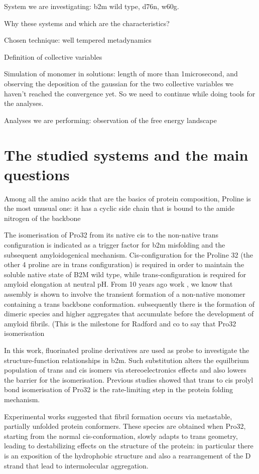 System we are investigating: b2m wild type, d76n, w60g.

Why these systems and which are the characteristics?

Chosen technique: well tempered metadynamics

Definition of collective variables

Simulation of monomer in solutions: length of more than 1microsecond, and observing the deposition of the gaussian for the two collective variables we haven't reached the convergence yet. So we need to continue while doing tools for the analyses.

Analyses we are performing:
observation of the free energy landscape 


\section{The studied systems and the main questions}
Among all the amino acids that are the basics of protein composition, Proline is the most unusual one: it has a cyclic side chain that is bound to the amide nitrogen of the backbone  

\cite{Torbeev_2013}
The isomerisation of Pro32 from its native cis to the non-native trans configuration is indicated as a trigger factor for b2m misfolding and the subsequent amyloidogenical mechanism.
Cis-configuration for the Proline 32 (the other 4 proline are in trans configuration) is required in order to maintain the soluble native state of B2M wild type, while trans-configuration is required for amyloid elongation at neutral pH. From 10 years ago work  , we know that assembly is shown to involve the transient formation of a non-native monomer containing a trans backbone conformation. subsequently there is the formation of dimeric species and higher aggregates that accumulate before the development of amyloid fibrils. (This is the milestone for Radford and co to say that Pro32 isomerisation

In this work, fluorinated proline derivatives are used as probe to investigate the structure-function relationships in b2m. Such substitution alters the equilbrium population of trans and cis isomers via stereoelectronics effects and also lowers the barrier for the isomerisation.
Previous studies showed that trans to cis prolyl bond isomerisation of Pro32 is the rate-limiting step in the protein folding mechanism.

Experimental works suggested that fibril formation occurs via metastable, partially unfolded protein conformers. These species are obtained when Pro32, starting from the normal cis-conformation, slowly adapts to trans geometry, leading to destabilizing effects on the structure of the protein: in particular there is an exposition of the hydrophobic structure and also a rearrangement of the D strand that lead to intermolecular aggregation. 